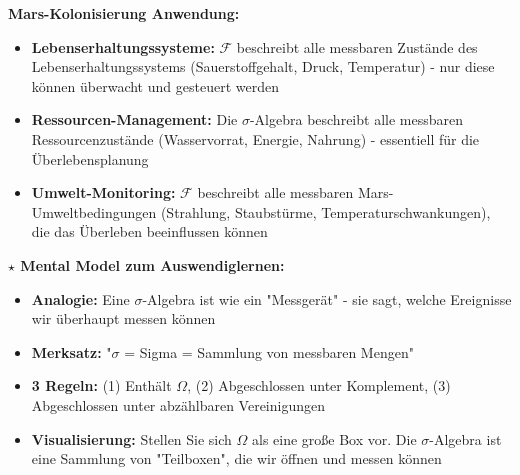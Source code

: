 \begin{denoobification}
\textbf{Mars-Kolonisierung Anwendung:}
\begin{itemize}
    \item \textbf{Lebenserhaltungssysteme:} $\mathcal{F}$ beschreibt alle messbaren Zustände des Lebenserhaltungssystems (Sauerstoffgehalt, Druck, Temperatur) - nur diese können überwacht und gesteuert werden
    \item \textbf{Ressourcen-Management:} Die $\sigma$-Algebra beschreibt alle messbaren Ressourcenzustände (Wasservorrat, Energie, Nahrung) - essentiell für die Überlebensplanung
    \item \textbf{Umwelt-Monitoring:} $\mathcal{F}$ beschreibt alle messbaren Mars-Umweltbedingungen (Strahlung, Staubstürme, Temperaturschwankungen), die das Überleben beeinflussen können
\end{itemize}

\textbf{$\star$ Mental Model zum Auswendiglernen:}
\begin{itemize}
    \item \textbf{Analogie:} Eine $\sigma$-Algebra ist wie ein "Messgerät" - sie sagt, welche Ereignisse wir überhaupt messen können
    \item \textbf{Merksatz:} "$\sigma$ = Sigma = Sammlung von messbaren Mengen"
    \item \textbf{3 Regeln:} (1) Enthält $\Omega$, (2) Abgeschlossen unter Komplement, (3) Abgeschlossen unter abzählbaren Vereinigungen
    \item \textbf{Visualisierung:} Stellen Sie sich $\Omega$ als eine große Box vor. Die $\sigma$-Algebra ist eine Sammlung von "Teilboxen", die wir öffnen und messen können
\end{itemize}
\end{denoobification}

